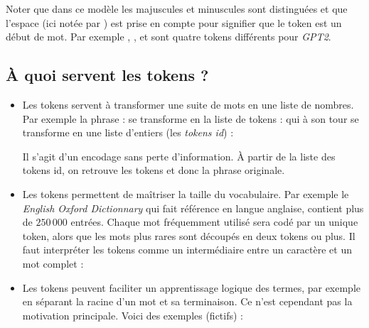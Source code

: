 \documentclass[11pt,class=report,crop=false]{standalone}
\begin{document}
Noter que dans ce modèle les majuscules et minuscules sont distinguées et que l'espace (ici notée par ) est prise en compte pour signifier que le token est un début de mot.
Par exemple , ,  et  sont quatre tokens différents pour \emph{GPT2}.

\subsection{À quoi servent les tokens ?}


\begin{itemize}
	\item Les tokens servent à transformer une suite de mots en une liste de nombres.
	Par exemple la phrase :
	se transforme en la liste de tokens :
	qui à son tour se transforme en une liste d'entiers (les \emph{tokens id}) :
	\mycenterline{[6759, 10024, 873, 318, 262, 16599, 286, 262, 19838]}
	
	Il s'agit d'un encodage sans perte d'information. À partir de la liste des tokens id, on retrouve les tokens et donc la phrase originale.
	
	\item Les tokens permettent de maîtriser la taille du vocabulaire.
	Par exemple le \emph{English Oxford Dictionnary} qui fait référence en langue anglaise, contient plus de $250\,000$ entrées. 
	Chaque mot fréquemment utilisé sera codé par un unique token, alors que les mots plus rares sont découpés en deux tokens ou plus. Il faut interpréter les tokens comme un intermédiaire entre un caractère et un mot complet :
	
	\item Les tokens peuvent faciliter un apprentissage logique des termes, par exemple en séparant la racine d'un mot et sa terminaison. Ce n'est cependant pas la motivation principale. Voici des exemples (fictifs) :

	
\end{itemize}	
	
\end{document}
